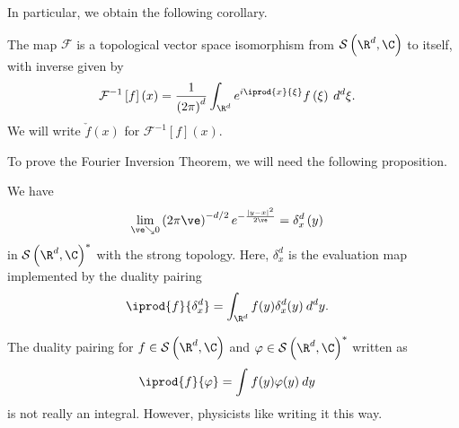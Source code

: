 \documentclass[10pt]{mypackage}
\begin{document}
In particular, we obtain the following corollary.
\begin{corollary}
  The map $\mathcal{F}$ is a topological vector space isomorphism from $ \mathcal{S}\left( \R^d,\C \right) $ to itself, with inverse given by
  \begin{align*}
    \mathcal{F}^{-1}\left[ f \right]\left( x \right) &= \frac{1}{\left( 2\pi \right)^{d}}\int_{\R^d}^{} e^{i \iprod{x}{\xi}}f\left( \xi \right)\:d^{d}\xi.
  \end{align*}
  We will write $\check{f}(x)$ for $\mathcal{F}^{-1}\left[ f \right](x)$.
\end{corollary}
To prove the Fourier Inversion Theorem, we will need the following proposition.
\begin{proposition}
  We have
  \begin{align*}
    \lim_{\ve\searrow 0}\left( 2\pi \ve \right)^{-d/2} e^{-\frac{\left\vert y-x \right\vert^2}{2\ve}} &= \delta^{d}_{x}\left( y \right)
  \end{align*}
  in $ \mathcal{S}\left( \R^d,\C \right)^{\ast} $ with the strong topology. Here, $\delta^{d}_{x}$ is the evaluation map implemented by the duality pairing
  \begin{align*}
    \iprod{f}{\delta^{d}_x} &= \int_{\R^d}^{} f(y)\delta^{d}_x(y)\:d^{d}y.
  \end{align*}
\end{proposition}
\begin{remark}
  The duality pairing for $f\in \mathcal{S}\left( \R^d,\C \right)$ and $\varphi\in \mathcal{S}\left( \R^d,\C \right)^{\ast}$ written as
  \begin{align*}
    \iprod{f}{\varphi} &= \int_{}^{} f(y)\varphi(y)\:dy
  \end{align*}
  is not really an integral. However, physicists like writing it this way.
\end{remark}
\end{document}
